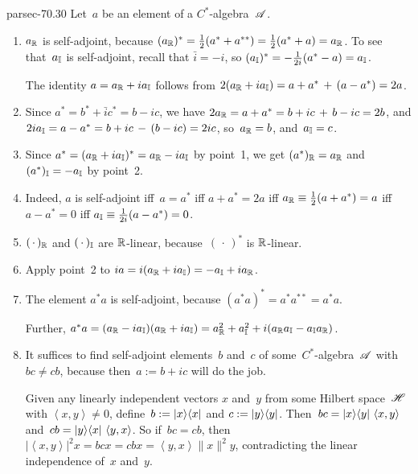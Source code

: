 \documentclass[b5page]{book}
\begin{document}
\begin{solution}{parsec-70.30}
Let~$a$ be an element of a $C^*$-algebra~$\mathscr{A}$.
\begin{enumerate}
    \item[1.]
$a_{\mathbb{R}}$ is self-adjoint, because
$(a_{\mathbb{R}})^*
        = \frac{1}{2}(a^{*}+a^{**}) = \frac{1}{2}(a^*+a) = a_{\mathbb{R}}$.
To see that~$a_{\mathbb{I}}$ is self-adjoint, recall
        that $\bar{i}=-i$,
so
        $(a_{\mathbb{I}})^*
        = -\frac{1}{2i}(a^*-a) 
        = a_{\mathbb{I}}$.

The identity $a=a_{\mathbb{R}}+ia_{\mathbb{I}}$
follows from
        $2(a_{\mathbb{R}}+ia_{\mathbb{I}})
        = a+a^* \,+\, (a-a^*)
        = 2a$.
    \item[2.]
    Since $a^*=b^*+\bar{i}c^* =b-ic$,
        we have $2a_{\mathbb{R}}=a+a^* = b+ic\,+\,b-ic = 2b$,
        and $2ia_{\mathbb{I}} = a-a^* = b+ic \,-\, (b-ic) = 2ic$,
        so~$a_{\mathbb{R}}=b$, and~$a_{\mathbb{I}}=c$.

\item[3.]
Since $a^* = (a_{\mathbb{R}}+ia_{\mathbb{I}})^*
        = a_{\mathbb{R}} - ia_{\mathbb{I}}$ by point~1,
        we get $(a^*)_{\mathbb{R}}=a_{\mathbb{R}}$
        and $(a^*)_{\mathbb{I}} = -a_{\mathbb{I}}$ by point~2.

\item[4.]
Indeed,
$a$ is self-adjoint iff~$a=a^*$
        iff $a+a^*=2a$
        iff $a_{\mathbb{R}} \equiv \frac{1}{2}(a+a^*) = a$
        iff $a-a^* = 0$
        iff $a_{\mathbb{I}}\equiv \frac{1}{2i}(a-a^*) = 0$.

\item[5.]
    $(\,\cdot\,)_{\mathbb{R}}$
        and $(\,\cdot\,)_{\mathbb{I}}$
        are $\mathbb{R}$-linear,
        because~$(\,\cdot\,)^*$
        is $\mathbb{R}$-linear.

\item[6.]
    Apply point~2 to
    $ia = i(a_{\mathbb{R}}+ia_{\mathbb{I}}) = -a_{\mathbb{I}}+ia_{\mathbb{R}}$.

\item[7.]
The element
$a^*a$ is self-adjoint,
        because $(a^*a)^*=a^*a^{**}=a^*a$.

Further,
        $a^*a = (a_{\mathbb{R}}-ia_{\mathbb{I}})(a_{\mathbb{R}}+ia_{\mathbb{I}})
        = a_{\mathbb{R}}^2 + a_{\mathbb{I}}^2 + i(a_{\mathbb{R}}a_{\mathbb{I}}-a_{\mathbb{I}}a_{\mathbb{R}})$.

\item[8.]
It suffices to find self-adjoint elements~$b$ and~$c$
of some~$C^*$-algebra~$\mathscr{A}$ with~$bc\neq cb$,
because then~$a:= b+ic$ will do the job.

Given any linearly independent vectors
$x$ and~$y$
from some Hilbert space~$\mathscr{H}$
with $\left<x,y\right>\neq 0$,
define~$b:=\left|x\right>\!\left<x\right|$ and $c:=\left|y\right>\!\left<y\right|$.
Then~$bc = \left|x\right>\!\left<y\right|\,\left<x,y\right> $
and~$cb=\left|y\right>\!\left<x\right|\,\left<y,x\right>$.
So if~$bc=cb$,
then~$\left|\left<x,y\right>\right|^2x = bcx
= cbx = \left<y,x\right>\|x\|^2y$,
contradicting the linear independence of~$x$ and~$y$.


\end{enumerate}
\end{solution}
\end{document}
